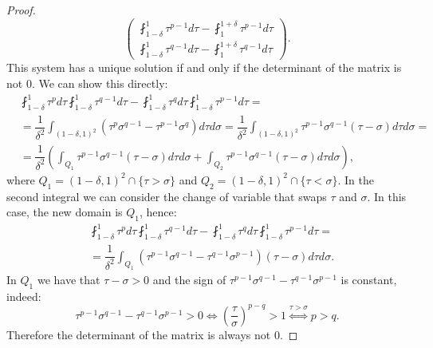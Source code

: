 \documentclass[corpo=11pt, stile=classica, tipotesi=custom,
greek, evenboxes, english]{toptesi}
\numberwithin{equation}{chapter}
\theoremstyle{definition}
\theoremstyle{remark}
\begin{document}
\begin{proof}
\begin{equation}
	\begin{pmatrix}
		\fint_{1-\delta}^1 \tau^{p-1} d\tau - \fint_1^{1+\delta} \tau^{p-1} d\tau\\
		\fint_{1-\delta}^1 \tau^{q-1} d\tau - \fint_1^{1+\delta} \tau^{q-1} d\tau
	\end{pmatrix}.
\end{equation}
This system has a unique solution if and only if the determinant of the matrix is not 0. We can show this directly:
\begin{align*}
	& \fint_{1-\delta}^1 \tau^{p} d\tau \fint_{1-\delta}^1 \tau^{q-1} d\tau - \fint_{1-\delta}^1 \tau^{q} d\tau \fint_{1-\delta}^1 \tau^{p-1} d\tau=\\
	&= \dfrac{1}{\delta^2} \int_{(1-\delta,1)^2} \left(\tau^p \sigma^{q-1} - \tau^{p-1}\sigma^q\right) d\tau d\sigma = \dfrac{1}{\delta^2} \int_{(1-\delta,1)^2} \tau^{p-1} \sigma^{q-1} \left( \tau - \sigma \right) d\tau d\sigma = \\
	&= \dfrac{1}{\delta^2} \left( \int_{Q_1} \tau^{p-1} \sigma^{q-1} \left( \tau - \sigma \right) d\tau d\sigma + \int_{Q_2} \tau^{p-1} \sigma^{q-1} \left( \tau - \sigma \right) d\tau d\sigma \right),
\end{align*}
where $Q_1=(1-\delta,1)^2 \cap \{\tau > \sigma\}$ and $Q_2=(1-\delta,1)^2 \cap \{\tau < \sigma\}$. In the second integral we can consider the change of variable that swaps $\tau$ and $\sigma$. In this case, the new domain is $Q_1$, hence:
\begin{align*}
	&\fint_{1-\delta}^1 \tau^{p} d\tau \fint_{1-\delta}^1 \tau^{q-1} d\tau - \fint_{1-\delta}^1 \tau^{q} d\tau \fint_{1-\delta}^1 \tau^{p-1} d\tau=\\
	&= \dfrac{1}{\delta^2} \int_{Q_1} \left(\tau^{p-1}\sigma^{q-1} - \tau^{q-1}\sigma^{p-1}\right) \left(\tau - \sigma\right) d\tau d\sigma.
\end{align*}
In $Q_1$ we have that $\tau - \sigma > 0$ and the sign of $\tau^{p-1}\sigma^{q-1} - \tau^{q-1}\sigma^{p-1}$ is constant, indeed:
\begin{equation*}
	\tau^{p-1}\sigma^{q-1} - \tau^{q-1}\sigma^{p-1} > 0 \iff \left(\dfrac{\tau}{\sigma}\right)^{p-q} > 1 \overset{\tau > \sigma}{\iff} p>q.
\end{equation*}
Therefore the determinant of the matrix is always not 0.


\end{proof}
\end{document}
